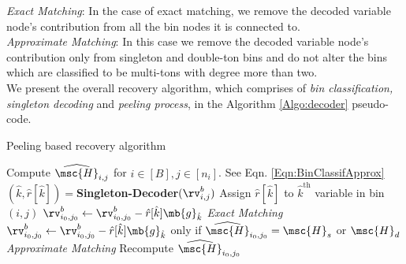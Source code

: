\begin{enumerate}
{\it Exact Matching}: In the case of exact matching, we remove the decoded variable node's contribution from all the bin nodes it is connected to.\\
{\it Approximate Matching}: In this case we remove the decoded variable node's contribution only from singleton and double-ton bins and do not alter the bins which are classified to be multi-tons with degree more than two.\\

We present the overall recovery algorithm, which comprises of {\it bin classification, singleton decoding} and {\it peeling process}, in the Algorithm \ref{Algo:decoder} pseudo-code.

\def\gap{4pt}
\begin{algorithm}[h!]
\caption{Peeling based recovery algorithm}
\label{Algo:decoder}
\begin{algorithmic}
\State Compute $\widehat{\msc{H}}_{i,j}$ for $i\in[B], j\in[n_i]$. See Eqn. \eqref{Eqn:BinClassifApprox}
\vspace{\gap}
\vspace{\gap}
  \State $(\hat{k},\hat{r}[\hat{k}])=${\bf Singleton-Decoder}$(\rv^b_{i,j})$
\vspace{\gap}
  \State Assign $\hat{r}[\hat{k}]$ to $\hat{k}^{\text{th}}$ variable in bin $(i,j)$
\vspace{\gap}
\vspace{\gap}
	   \State $\rv^{b}_{i_0,j_0}\gets\rv^{b}_{i_0,j_0}-\hat{r}[\hat{k}]\mb{g}_{\hat{k}}$   \hspace{45.5ex} {\it Exact Matching}
	   \vspace{\gap}
	   \State $\rv^{b}_{i_0,j_0}\gets\rv^{b}_{i_0,j_0}-\hat{r}[\hat{k}]\mb{g}_{\hat{k}}$   \hspace{10ex} only if $\widehat{\msc{H}}_{i_0,j_0}=\msc{H}_s$ or $\msc{H}_d$ \hspace{10ex} {\it Approximate Matching}
	   \vspace{\gap}
	   \State Recompute $\widehat{\msc{H}}_{i_0,j_0}$
      \EndFor
\EndWhile
\end{algorithmic}
\end{algorithm}


\end{enumerate}
